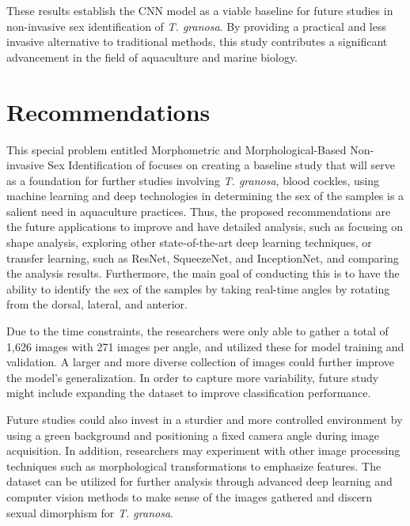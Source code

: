 These results establish the CNN model as a viable baseline for future studies in non-invasive sex identification of \textit{T. granosa}. By providing a practical and less invasive alternative to traditional methods, this study contributes a significant advancement in the field of aquaculture and marine biology.

\section{Recommendations}

This special problem entitled Morphometric and Morphological-Based Non-invasive Sex Identification of \Tgranosa focuses on creating a baseline study that will serve as a foundation for further studies involving \textit{T. granosa}, blood cockles, using machine learning and deep technologies in determining the sex of the samples is a salient need in aquaculture practices. Thus, the proposed recommendations are the future applications to improve and have detailed analysis, such as focusing on shape analysis, exploring other state-of-the-art deep learning techniques, or transfer learning, such as ResNet, SqueezeNet, and InceptionNet, and comparing the analysis results. Furthermore, the main goal of conducting this is to have the ability to identify the sex of the samples by taking real-time angles by rotating from the dorsal, lateral, and anterior.

Due to the time constraints, the researchers were only able to gather a total of 1,626 images with 271 images per angle, and utilized these for model training and validation. A larger and more diverse collection of images could further improve the model’s generalization. In order to capture more variability, future study might include expanding the dataset to improve classification performance. 

Future studies could also invest in a sturdier and more controlled environment by using a green background and positioning a fixed camera angle during image acquisition. In addition, researchers may experiment with other image processing techniques such as morphological transformations to emphasize features. The dataset can be utilized for further analysis through advanced deep learning and computer vision methods to make sense of the images gathered and discern sexual dimorphism for \textit{T. granosa}. 